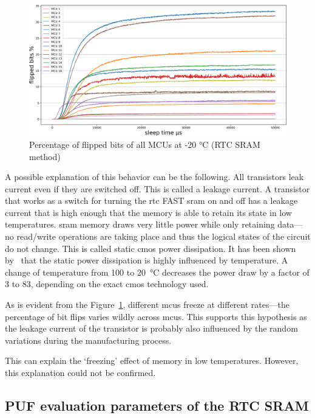 \begin{figure}[ht!]
    \centering
    \captionsetup{justification=centering,margin=0.5cm}
    \includegraphics[width=\textwidth]{images/all_minus_20_rtc.png}
    \caption{Percentage of flipped bits of all MCUs at -20 °C (RTC SRAM method)}
    \label{fig:all_minus_20_rtc}
\end{figure}

A possible explanation of this behavior can be the following. All transistors leak current even if they are switched off. This is called a leakage current. A transistor that works as a switch for turning the \gls{rtc} FAST \gls{sram} on and off has a leakage current that is high enough that the memory is able to retain its state in low temperatures. \gls{sram} memory draws very little power while only retaining data---no read/write operations are taking place and thus the logical states of the circuit do not change. This is called static \gls{cmos} power dissipation. It has been shown by~\cite{Kocanda2015} that the static power dissipation is highly influenced by temperature. A change of temperature from 100 to 20~°C decreases the power draw by a factor of 3 to 83, depending on the exact \gls{cmos} technology used.

As is evident from the Figure~\ref{fig:all_minus_20_rtc}, different \glspl{mcu} freeze at different rates---the percentage of bit flips varies wildly across \glspl{mcu}. This supports this hypothesis as the leakage current of the transistor is probably also influenced by the random variations during the manufacturing process.

This can explain the `freezing' effect of memory in low temperatures. However, this explanation could not be confirmed.

\subsection[PUF evaluation parameters]{PUF evaluation parameters of the RTC SRAM}\label{sec:rtc_evaluation}

